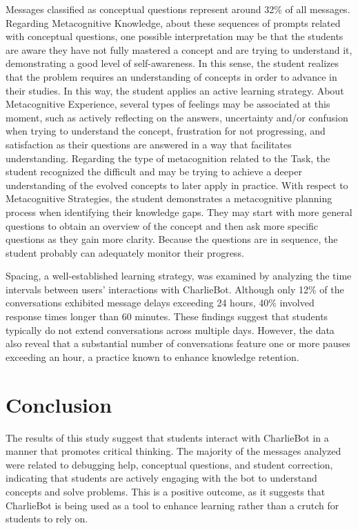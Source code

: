 \documentclass[a4paper,twoside]{article}
\begin{document}
Messages classified as conceptual questions represent around 32\% of all
messages. Regarding Metacognitive Knowledge, about these sequences of prompts
related with conceptual questions, one possible interpretation may be that the
students are aware they have not fully mastered a concept and are trying to
understand it, demonstrating a good level of self-awareness. In this sense, the
student realizes that the problem requires an understanding of concepts in order
to advance in their studies. In this way, the student applies an active learning
strategy. About Metacognitive Experience, several types of feelings may be
associated at this moment, such as actively reflecting on the answers,
uncertainty and/or confusion when trying to understand the concept, frustration
for not progressing, and satisfaction as their questions are answered in a
way that facilitates understanding. Regarding the type of metacognition related
to the Task, the student recognized the difficult and may be trying to achieve a
deeper understanding of the evolved concepts to later apply in practice. With
respect to Metacognitive Strategies, the student demonstrates a metacognitive
planning process when identifying their knowledge gaps. They may start with more
general questions to obtain an overview of the concept and then ask more
specific questions as they gain more clarity. Because the questions are in
sequence, the student probably can adequately monitor their progress.


Spacing, a well-established learning strategy, was examined by analyzing
the time intervals between users’ interactions with CharlieBot. Although
only 12\% of the conversations exhibited message delays exceeding 24 hours,
40\% involved response times longer than 60 minutes. These findings suggest
that students typically do not extend conversations across multiple days.
However, the data also reveal that a substantial number of conversations
feature one or more pauses exceeding an hour, a practice known to enhance
knowledge retention.





\section{Conclusion}

The results of this study suggest that students interact with CharlieBot in a
manner that promotes critical thinking. The majority of the messages analyzed
were related to debugging help, conceptual questions, and student correction,
indicating that students are actively engaging with the bot to understand
concepts and solve problems. This is a positive outcome, as it suggests that
CharlieBot is being used as a tool to enhance learning rather than a crutch for
students to rely on.
\end{document}
